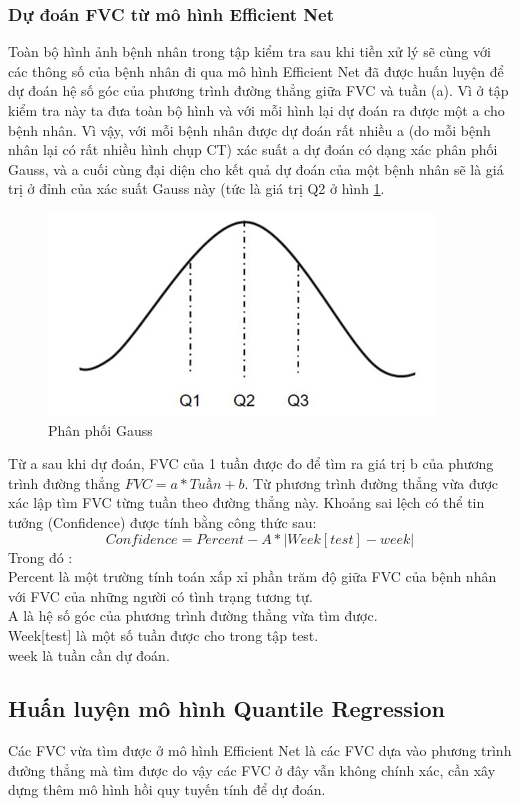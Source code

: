 \subsubsection{Dự đoán FVC từ mô hình Efficient Net}
Toàn bộ hình ảnh bệnh nhân trong tập kiểm tra sau khi tiền xử lý sẽ cùng với các thông số của bệnh nhân đi qua mô hình Efficient Net đã được huấn luyện để dự đoán hệ số góc của phương trình đường thẳng giữa FVC và tuần (a). Vì ở tập kiểm tra này ta đưa toàn bộ hình và với mỗi hình lại dự đoán ra được một a cho bệnh nhân. Vì vậy, với mỗi bệnh nhân được dự đoán rất nhiều a (do mỗi bệnh nhân lại có rất nhiều hình chụp CT)  xác suất a dự đoán có dạng xác phân phối Gauss, và a cuối cùng đại diện cho kết quả dự đoán của một bệnh nhân sẽ là giá trị ở đỉnh của xác suất Gauss này (tức là giá trị Q2 ở hình \ref{fig:train2}.\par
\begin{figure}[ht!]
\centerline{\includegraphics[scale=0.7]{images/train2.png}}
\caption{Phân phối Gauss}
\label{fig:train2}
\end{figure}
Từ a sau khi dự đoán, FVC của 1 tuần được đo để tìm ra giá trị b của phương trình đường thẳng $FVC = a*Tuần + b$. Từ phương trình đường thẳng vừa được xác lập tìm FVC từng tuần theo đường thẳng này. Khoảng sai lệch có thể tin tưởng (Confidence) được tính bằng công thức sau:
\begin{equation}
Confidence = Percent - A*|Week[test] - week|
\end{equation}
Trong đó :\\ 
\tab Percent là một trường tính toán xấp xỉ phần trăm độ giữa FVC của bệnh nhân với FVC của những người có tình trạng tương tự.\\
\tab A là hệ số góc của phương trình đường thẳng vừa tìm được.\\
\tab Week[test] là một số tuần được cho trong tập test.\\
\tab week là tuần cần dự đoán.

\subsection{Huấn luyện mô hình Quantile Regression}
Các FVC vừa tìm được ở mô hình Efficient Net là các FVC dựa vào phương trình đường thẳng mà tìm được do vậy các FVC ở đây vẫn không chính xác, cần xây dựng thêm mô hình hồi quy tuyến tính để dự đoán.
